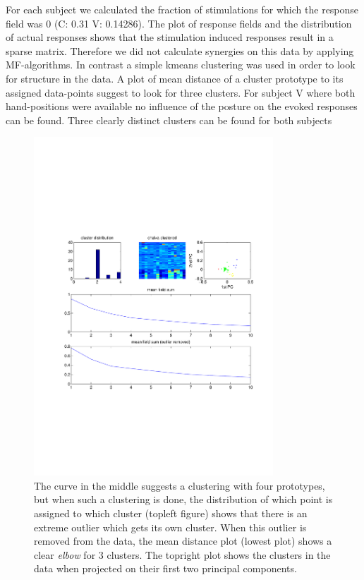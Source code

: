For each subject we calculated the fraction of stimulations for which the response field was 0 (C: 0.31 V: 0.14286). The plot of response fields and the distribution of actual responses shows that the stimulation induced responses result in a sparse matrix. Therefore we did not calculate synergies on this data by applying MF-algorithms. In contrast a simple kmeans clustering was used in order to look for structure in the data. A plot of mean distance of a cluster prototype to its assigned data-points suggest to look for three clusters. For subject V where both hand-positions were available no influence of the posture on the evoked responses can be found. Three clearly distinct clusters can be found for both subjects
\begin{figure}[ht]
    \centering
        \includegraphics[width=0.8\textwidth]{images/raw_clusters_chalva.pdf}
    \caption{The curve in the middle suggests a clustering with four prototypes, but when such a clustering is done, the distribution of which point is assigned to which cluster (topleft figure) shows that there is an extreme outlier which gets its own cluster. When this outlier is removed from the data, the mean distance plot (lowest plot) shows a clear \emph{elbow} for 3 clusters. The topright plot shows the clusters in the data when projected on their first two principal components.}
    \label{sg:fig:images_raw_clusters_chalva}
\end{figure}
